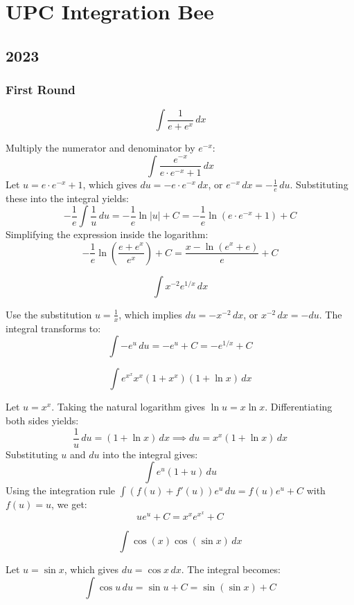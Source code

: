 \section{UPC Integration Bee}
\subsection*{2023}
\subsubsection*{First Round}
\begin{questions}
    \question \[ \int \frac{1}{e+e^x} \,dx \]
    \begin{solution}
        Multiply the numerator and denominator by $e^{-x}$:
        \[ \int \frac{e^{-x}}{e \cdot e^{-x} + 1} \,dx \]
        Let $u = e \cdot e^{-x} + 1$, which gives $du = -e \cdot e^{-x} \,dx$, or $e^{-x} \,dx = -\frac{1}{e} \,du$. Substituting these into the integral yields:
        \[ -\frac{1}{e} \int \frac{1}{u} \,du = -\frac{1}{e} \ln|u| + C = -\frac{1}{e} \ln(e \cdot e^{-x} + 1) + C \]
        Simplifying the expression inside the logarithm:
        \[ -\frac{1}{e} \ln\left(\frac{e + e^x}{e^x}\right) + C = \frac{x - \ln(e^x + e)}{e} + C \]
    \end{solution}

    \question \[ \int x^{-2}e^{1/x} \,dx \]
    \begin{solution}
        Use the substitution $u = \frac{1}{x}$, which implies $du = -x^{-2} \,dx$, or $x^{-2} \,dx = -du$. The integral transforms to:
        \[ \int -e^u \,du = -e^u + C = -e^{1/x} + C \]
    \end{solution}

    \question \[ \int e^{x^x}x^x(1+x^x)(1+\ln x) \,dx \]
    \begin{solution}
        Let $u = x^x$. Taking the natural logarithm gives $\ln u = x \ln x$. Differentiating both sides yields:
        \[ \frac{1}{u} \,du = (1 + \ln x) \,dx \implies du = x^x(1 + \ln x) \,dx \]
        Substituting $u$ and $du$ into the integral gives:
        \[ \int e^u (1 + u) \,du \]
        Using the integration rule $\int (f(u) + f'(u))e^u \,du = f(u)e^u + C$ with $f(u) = u$, we get:
        \[ u e^u + C = x^x e^{x^x} + C \]
    \end{solution}

    \question \[ \int \cos(x)\cos(\sin x) \,dx \]
    \begin{solution}
        Let $u = \sin x$, which gives $du = \cos x \,dx$. The integral becomes:
        \[ \int \cos u \,du = \sin u + C = \sin(\sin x) + C \]
    \end{solution}


\end{questions}
